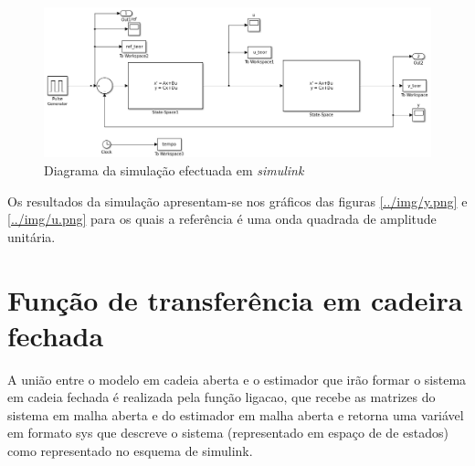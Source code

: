 \documentclass[%
  reprint,
  nofootinbib,
  amsmath,amssymb,
  aps,
  10pt,
  a4paper
]{revtex4-1}
\begin{document}
\begin{figure}[t]
  \includegraphics[width=.6\textheight]{../img/simulink.png}%
  \caption{\label{../img/simulink.png} Diagrama da simulação efectuada em {\it simulink}}
\end{figure}


Os resultados da simulação apresentam-se nos gráficos das figuras \ref{../img/y.png} e \ref{../img/u.png} para os quais a referência é uma onda quadrada de amplitude unitária.

\section{Função de transferência em cadeira fechada}
A união entre o modelo em cadeia aberta e o estimador que irão formar o sistema em cadeia fechada é realizada pela função ligacao, que recebe as matrizes do sistema em malha aberta e do estimador em malha aberta e retorna uma variável em formato sys que descreve o sistema (representado em espaço de de estados) como representado no esquema de simulink.

\end{document}

